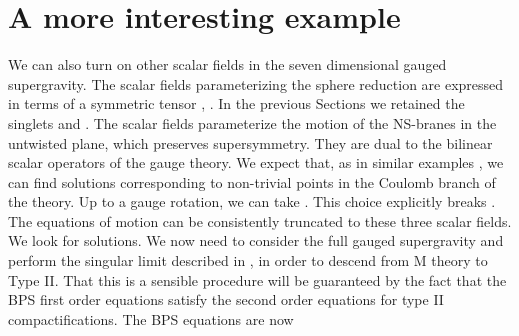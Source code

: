 \documentclass[a4paper,12pt]{article}
\begin{document}
\section{A more interesting example}
We can also turn on other scalar fields in the seven dimensional gauged supergravity. The scalar fields parameterizing the sphere reduction are
expressed in terms of a symmetric \coordHE{} tensor \coordHE{}, \coordHE{}.
In the previous Sections we retained the \coordHE{} 
singlets \coordHE{} and 
\coordHE{}. The scalar fields \coordHE{}
parameterize the motion of the NS-branes in the untwisted \coordHE{} plane,
which preserves \coordHE{} supersymmetry. They are dual to the bilinear scalar 
operators of the \coordHE{} gauge theory. 
We expect that, as in similar \coordHE{} examples \cite{freed2,pw}, we can
find solutions corresponding to non-trivial points in the Coulomb branch
of the \coordHE{} theory. Up to a gauge rotation, we can take
\coordHE{}. This choice explicitly breaks \coordHE{}. 
The equations of motion can be consistently truncated to
these three scalar fields. We look for \coordHE{} solutions. We now need to
consider the full \coordHE{} gauged supergravity and perform the
singular limit described in \cite{cve2}, in order to
descend from M theory to Type II. That this is a sensible
procedure will be guaranteed by the fact that the BPS first order
equations satisfy the second order equations \cite{cve1} for
type II compactifications. The BPS equations are now
\end{document}
